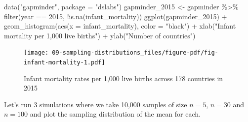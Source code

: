 \documentclass[
  letterpaper,
  DIV=11,
  numbers=noendperiod]{scrreprt}
\newenvironment{Shaded}{\begin{snugshade}}{\end{snugshade}}
\newcommand{\AttributeTok}[1]{\textcolor[rgb]{0.40,0.45,0.13}{#1}}
\newcommand{\DecValTok}[1]{\textcolor[rgb]{0.68,0.00,0.00}{#1}}
\newcommand{\FunctionTok}[1]{\textcolor[rgb]{0.28,0.35,0.67}{#1}}
\newcommand{\NormalTok}[1]{\textcolor[rgb]{0.00,0.23,0.31}{#1}}
\newcommand{\OtherTok}[1]{\textcolor[rgb]{0.00,0.23,0.31}{#1}}
\newcommand{\SpecialCharTok}[1]{\textcolor[rgb]{0.37,0.37,0.37}{#1}}
\newcommand{\StringTok}[1]{\textcolor[rgb]{0.13,0.47,0.30}{#1}}
\theoremstyle{definition}
\theoremstyle{remark}
\begin{document}
\begin{Shaded}
\begin{Highlighting}[]
\FunctionTok{data}\NormalTok{(}\StringTok{"gapminder"}\NormalTok{, }\AttributeTok{package =} \StringTok{"dslabs"}\NormalTok{) }
\NormalTok{gapminder\_2015 }\OtherTok{\textless{}{-}}\NormalTok{ gapminder }\SpecialCharTok{\%\textgreater{}\%} 
  \FunctionTok{filter}\NormalTok{(year }\SpecialCharTok{==} \DecValTok{2015}\NormalTok{, }\SpecialCharTok{!}\FunctionTok{is.na}\NormalTok{(infant\_mortality))}
\FunctionTok{ggplot}\NormalTok{(gapminder\_2015) }\SpecialCharTok{+}
  \FunctionTok{geom\_histogram}\NormalTok{(}\FunctionTok{aes}\NormalTok{(}\AttributeTok{x =}\NormalTok{ infant\_mortality), }\AttributeTok{color =} \StringTok{"black"}\NormalTok{)  }\SpecialCharTok{+}
  \FunctionTok{xlab}\NormalTok{(}\StringTok{"Infant mortality per 1,000 live births"}\NormalTok{) }\SpecialCharTok{+}
  \FunctionTok{ylab}\NormalTok{(}\StringTok{"Number of countries"}\NormalTok{)}
\end{Highlighting}
\end{Shaded}

\begin{figure}[H]

{\centering \texttt{[image: 09-sampling-distributions\_files/figure-pdf/fig-infant-mortality-1.pdf]}

}

\caption{\label{fig-infant-mortality}Infant mortality rates per 1,000
live births across 178 countries in 2015}

\end{figure}

Let's run 3 simulations where we take 10,000 samples of size \(n = 5\),
\(n = 30\) and \(n = 100\) and plot the sampling distribution of the
mean for each.
\end{document}
